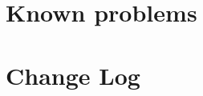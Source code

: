 \begin{appendix}
\begin{comment}
\chapter{\textit{Migration of the \appName\ system}}


\chapter{\textit{Backup}}

\end{comment}
\chapter{Known problems}
\label{chap:knownProblems}


\chapter{Change Log}


\end{appendix}
